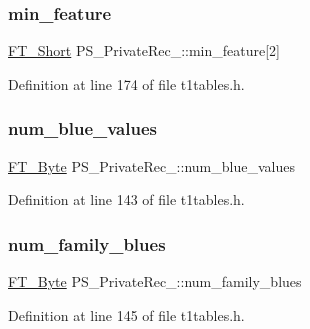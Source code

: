 \subsubsection{\texorpdfstring{min\_feature}{min\_feature}}
{\footnotesize\ttfamily \mbox{\hyperlink{fttypes_8h_aa7279be89046a2563cd3d4d6651fbdcf}{F\+T\+\_\+\+Short}} P\+S\+\_\+\+Private\+Rec\+\_\+\+::min\+\_\+feature\mbox{[}2\mbox{]}}



Definition at line 174 of file t1tables.\+h.

\mbox{\label{struct_p_s___private_rec___ae3c56e75b5674451a7296cbb9f0a2e40}} 
\subsubsection{\texorpdfstring{num\_blue\_values}{num\_blue\_values}}
{\footnotesize\ttfamily \mbox{\hyperlink{fttypes_8h_a51f26183ca0c9f4af958939648caeccd}{F\+T\+\_\+\+Byte}} P\+S\+\_\+\+Private\+Rec\+\_\+\+::num\+\_\+blue\+\_\+values}



Definition at line 143 of file t1tables.\+h.

\mbox{\label{struct_p_s___private_rec___a1e8a432c78f00034c73cfc54c787b10f}} 
\subsubsection{\texorpdfstring{num\_family\_blues}{num\_family\_blues}}
{\footnotesize\ttfamily \mbox{\hyperlink{fttypes_8h_a51f26183ca0c9f4af958939648caeccd}{F\+T\+\_\+\+Byte}} P\+S\+\_\+\+Private\+Rec\+\_\+\+::num\+\_\+family\+\_\+blues}



Definition at line 145 of file t1tables.\+h.

\mbox{\label{struct_p_s___private_rec___a7370e2e89f39f7ff8923f3d1befbcfce}} 
